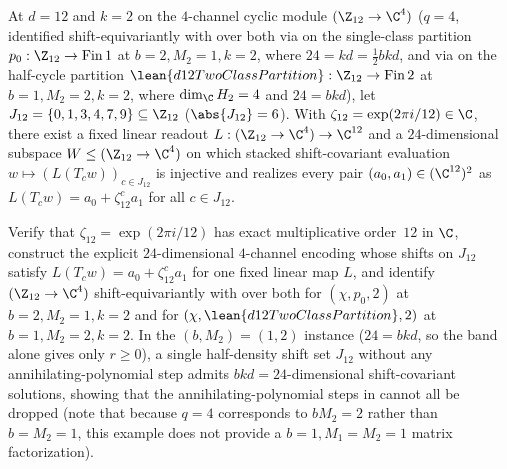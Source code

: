 \begin{example}[Shift-covariant $4$-channel band witness at $d = 12$ over $\C$]\label{ex:d12-band}
At $d = 12$ and $k = 2$ on the $4$-channel cyclic module $(\Z_{12} \to \C^4)$ ($q = 4$, identified
shift-equivariantly with  over
 both via  on the
single-class partition $p_0 : \Z_{12} \to \mathrm{Fin}\,1$ at $b = 2, M_2 = 1, k = 2$, where
$24 = kd = \frac{1}{2}bkd$, and via  on the half-cycle
partition $\lean{d12TwoClassPartition} : \Z_{12} \to \mathrm{Fin}\,2$ at $b = 1, M_2 = 2, k = 2$,
where $\dim_\C H_2 = 4$ and $24 = bkd$), let $J_{12} = \{0, 1, 3, 4, 7, 9\} \subseteq \Z_{12}$
($\abs{J_{12}} = 6$). With $\zeta_{12} = \exp(2\pi i / 12) \in \C$, there exist a fixed linear readout
$L : (\Z_{12} \to \C^4) \to \C^{12}$ and a $24$-dimensional subspace $W \le (\Z_{12} \to \C^4)$ on
which stacked shift-covariant evaluation $w \mapsto (L(T_c w))_{c \in J_{12}}$ is injective and
realizes every pair $(a_0, a_1) \in (\C^{12})^2$ as $L(T_c w) = a_0 + \zeta_{12}^c a_1$ for all
$c \in J_{12}$.
\end{example}
\begin{outline}
Verify that $\zeta_{12} = \exp(2\pi i / 12)$ has exact multiplicative order~$12$ in $\C$, construct
the explicit $24$-dimensional $4$-channel encoding whose shifts on $J_{12}$ satisfy
$L(T_c w) = a_0 + \zeta_{12}^c a_1$ for one fixed linear map $L$, and identify $(\Z_{12} \to \C^4)$
shift-equivariantly with  over
 both for $(\chi, p_0, 2)$ at $b = 2, M_2 = 1, k = 2$ and for
$(\chi, \lean{d12TwoClassPartition}, 2)$ at $b = 1, M_2 = 2, k = 2$. In the $(b, M_2) = (1, 2)$
instance ($24 = bkd$, so the band alone gives only $r \ge 0$), a single half-density shift set
$J_{12}$ without any annihilating-polynomial step admits $bkd = 24$-dimensional shift-covariant
solutions, showing that the annihilating-polynomial steps in  cannot all be
dropped (note that because $q = 4$ corresponds to $b M_2 = 2$ rather than $b = M_2 = 1$, this example
does not provide a $b = 1, M_1 = M_2 = 1$ matrix factorization).
\end{outline}
